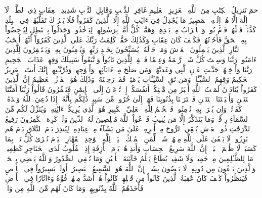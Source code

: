 حمٓ
تَنزِيلُ ٱلۡكِتَٰبِ مِنَ ٱللَّهِ ٱلۡعَزِيزِ ٱلۡعَلِيمِ
غَافِرِ ٱلذَّنۢبِ وَقَابِلِ ٱلتَّوۡبِ شَدِيدِ ٱلۡعِقَابِ ذِي ٱلطَّوۡلِۖ لَآ إِلَٰهَ إِلَّا هُوَۖ إِلَيۡهِ ٱلۡمَصِيرُ
مَا يُجَٰدِلُ فِيٓ ءَايَٰتِ ٱللَّهِ إِلَّا ٱلَّذِينَ كَفَرُواْ فَلَا يَغۡرُرۡكَ تَقَلُّبُهُمۡ فِي ٱلۡبِلَٰدِ
كَذَّبَتۡ قَبۡلَهُمۡ قَوۡمُ نُوحٖ وَٱلۡأَحۡزَابُ مِنۢ بَعۡدِهِمۡۖ وَهَمَّتۡ كُلُّ أُمَّةِۭ بِرَسُولِهِمۡ لِيَأۡخُذُوهُۖ وَجَٰدَلُواْ بِٱلۡبَٰطِلِ لِيُدۡحِضُواْ بِهِ ٱلۡحَقَّ فَأَخَذۡتُهُمۡۖ فَكَيۡفَ كَانَ عِقَابِ
وَكَذَٰلِكَ حَقَّتۡ كَلِمَتُ رَبِّكَ عَلَى ٱلَّذِينَ كَفَرُوٓاْ أَنَّهُمۡ أَصۡحَٰبُ ٱلنَّارِ
ٱلَّذِينَ يَحۡمِلُونَ ٱلۡعَرۡشَ وَمَنۡ حَوۡلَهُۥ يُسَبِّحُونَ بِحَمۡدِ رَبِّهِمۡ وَيُؤۡمِنُونَ بِهِۦ وَيَسۡتَغۡفِرُونَ لِلَّذِينَ ءَامَنُواْۖ رَبَّنَا وَسِعۡتَ كُلَّ شَيۡءٖ رَّحۡمَةٗ وَعِلۡمٗا فَٱغۡفِرۡ لِلَّذِينَ تَابُواْ وَٱتَّبَعُواْ سَبِيلَكَ وَقِهِمۡ عَذَابَ ٱلۡجَحِيمِ
رَبَّنَا وَأَدۡخِلۡهُمۡ جَنَّـٰتِ عَدۡنٍ ٱلَّتِي وَعَدتَّهُمۡ وَمَن صَلَحَ مِنۡ ءَابَآئِهِمۡ وَأَزۡوَٰجِهِمۡ وَذُرِّيَّـٰتِهِمۡۚ إِنَّكَ أَنتَ ٱلۡعَزِيزُ ٱلۡحَكِيمُ
وَقِهِمُ ٱلسَّيِّـَٔاتِۚ وَمَن تَقِ ٱلسَّيِّـَٔاتِ يَوۡمَئِذٖ فَقَدۡ رَحِمۡتَهُۥۚ وَذَٰلِكَ هُوَ ٱلۡفَوۡزُ ٱلۡعَظِيمُ
إِنَّ ٱلَّذِينَ كَفَرُواْ يُنَادَوۡنَ لَمَقۡتُ ٱللَّهِ أَكۡبَرُ مِن مَّقۡتِكُمۡ أَنفُسَكُمۡ إِذۡ تُدۡعَوۡنَ إِلَى ٱلۡإِيمَٰنِ فَتَكۡفُرُونَ
قَالُواْ رَبَّنَآ أَمَتَّنَا ٱثۡنَتَيۡنِ وَأَحۡيَيۡتَنَا ٱثۡنَتَيۡنِ فَٱعۡتَرَفۡنَا بِذُنُوبِنَا فَهَلۡ إِلَىٰ خُرُوجٖ مِّن سَبِيلٖ
ذَٰلِكُم بِأَنَّهُۥٓ إِذَا دُعِيَ ٱللَّهُ وَحۡدَهُۥ كَفَرۡتُمۡ وَإِن يُشۡرَكۡ بِهِۦ تُؤۡمِنُواْۚ فَٱلۡحُكۡمُ لِلَّهِ ٱلۡعَلِيِّ ٱلۡكَبِيرِ
هُوَ ٱلَّذِي يُرِيكُمۡ ءَايَٰتِهِۦ وَيُنَزِّلُ لَكُم مِّنَ ٱلسَّمَآءِ رِزۡقٗاۚ وَمَا يَتَذَكَّرُ إِلَّا مَن يُنِيبُ
فَٱدۡعُواْ ٱللَّهَ مُخۡلِصِينَ لَهُ ٱلدِّينَ وَلَوۡ كَرِهَ ٱلۡكَٰفِرُونَ
رَفِيعُ ٱلدَّرَجَٰتِ ذُو ٱلۡعَرۡشِ يُلۡقِي ٱلرُّوحَ مِنۡ أَمۡرِهِۦ عَلَىٰ مَن يَشَآءُ مِنۡ عِبَادِهِۦ لِيُنذِرَ يَوۡمَ ٱلتَّلَاقِ
يَوۡمَ هُم بَٰرِزُونَۖ لَا يَخۡفَىٰ عَلَى ٱللَّهِ مِنۡهُمۡ شَيۡءٞۚ لِّمَنِ ٱلۡمُلۡكُ ٱلۡيَوۡمَۖ لِلَّهِ ٱلۡوَٰحِدِ ٱلۡقَهَّارِ
ٱلۡيَوۡمَ تُجۡزَىٰ كُلُّ نَفۡسِۭ بِمَا كَسَبَتۡۚ لَا ظُلۡمَ ٱلۡيَوۡمَۚ إِنَّ ٱللَّهَ سَرِيعُ ٱلۡحِسَابِ
وَأَنذِرۡهُمۡ يَوۡمَ ٱلۡأٓزِفَةِ إِذِ ٱلۡقُلُوبُ لَدَى ٱلۡحَنَاجِرِ كَٰظِمِينَۚ مَا لِلظَّـٰلِمِينَ مِنۡ حَمِيمٖ وَلَا شَفِيعٖ يُطَاعُ
يَعۡلَمُ خَآئِنَةَ ٱلۡأَعۡيُنِ وَمَا تُخۡفِي ٱلصُّدُورُ
وَٱللَّهُ يَقۡضِي بِٱلۡحَقِّۖ وَٱلَّذِينَ يَدۡعُونَ مِن دُونِهِۦ لَا يَقۡضُونَ بِشَيۡءٍۗ إِنَّ ٱللَّهَ هُوَ ٱلسَّمِيعُ ٱلۡبَصِيرُ
۞أَوَلَمۡ يَسِيرُواْ فِي ٱلۡأَرۡضِ فَيَنظُرُواْ كَيۡفَ كَانَ عَٰقِبَةُ ٱلَّذِينَ كَانُواْ مِن قَبۡلِهِمۡۚ كَانُواْ هُمۡ أَشَدَّ مِنۡهُمۡ قُوَّةٗ وَءَاثَارٗا فِي ٱلۡأَرۡضِ فَأَخَذَهُمُ ٱللَّهُ بِذُنُوبِهِمۡ وَمَا كَانَ لَهُم مِّنَ ٱللَّهِ مِن وَاقٖ
